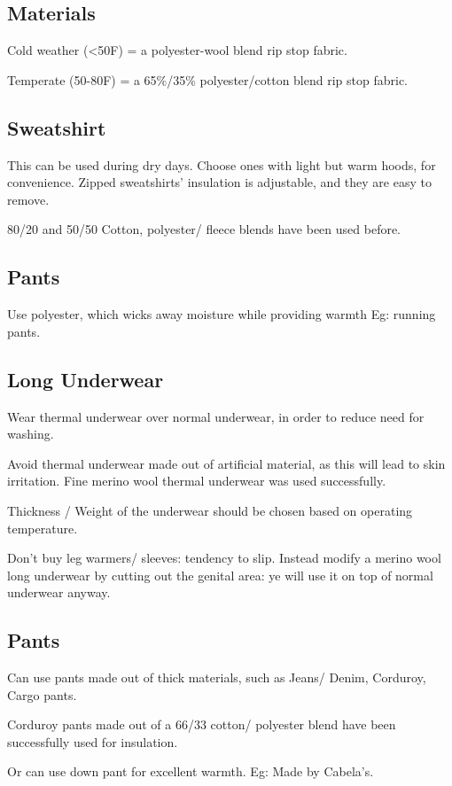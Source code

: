 \documentclass[oneside, article]{memoir}
\begin{document}
\subsection{Materials}
Cold weather (<50F) = a polyester-wool blend rip stop fabric.

Temperate (50-80F) = a 65\%/35\% polyester/cotton blend rip stop fabric.

\subsection{Sweatshirt}

This can be used during dry days. Choose ones with light but warm hoods, for convenience. Zipped sweatshirts' insulation is adjustable, and they are easy to remove.

80/20 and 50/50 Cotton, polyester/ fleece blends have been used before.

\subsection{Pants}
Use polyester, which wicks away moisture while providing warmth Eg: running pants.

\subsection{Long Underwear}
Wear thermal underwear over normal underwear, in order to reduce need for washing.

Avoid thermal underwear made out of artificial material, as this will lead to skin irritation. Fine merino wool thermal underwear was used successfully.

Thickness / Weight of the underwear should be chosen based on operating temperature.

Don't buy leg warmers/ sleeves: tendency to slip. Instead modify a merino wool long underwear by cutting out the genital area: ye will use it on top of normal underwear anyway.

\subsection{Pants}
Can use pants made out of thick materials, such as Jeans/ Denim, Corduroy, Cargo pants.

Corduroy pants made out of a 66/33 cotton/ polyester blend have been successfully used for insulation.

Or can use down pant for excellent warmth. Eg: Made by Cabela's.
\end{document}
